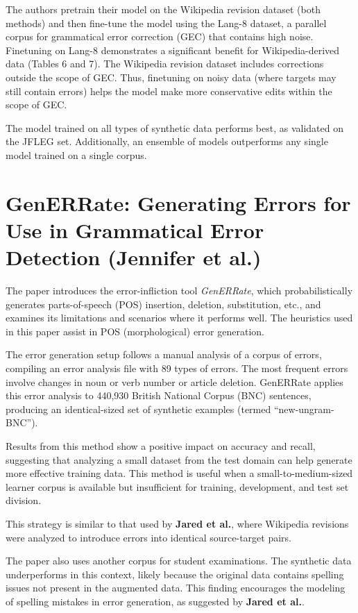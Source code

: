 \documentclass{article}
\begin{document}
The authors pretrain their model on the Wikipedia revision dataset (both methods) and then fine-tune the model using the Lang-8 dataset, a parallel corpus for grammatical error correction (GEC) that contains high noise. Finetuning on Lang-8 demonstrates a significant benefit for Wikipedia-derived data (Tables 6 and 7). The Wikipedia revision dataset includes corrections outside the scope of GEC. Thus, finetuning on noisy data (where targets may still contain errors) helps the model make more conservative edits within the scope of GEC.

The model trained on all types of synthetic data performs best, as validated on the JFLEG set. Additionally, an ensemble of models outperforms any single model trained on a single corpus.

\section{GenERRate: Generating Errors for Use in Grammatical Error Detection (Jennifer et al.)}

The paper introduces the error-infliction tool \textit{GenERRate}, which probabilistically generates parts-of-speech (POS) insertion, deletion, substitution, etc., and examines its limitations and scenarios where it performs well. The heuristics used in this paper assist in POS (morphological) error generation.

The error generation setup follows a manual analysis of a corpus of errors, compiling an error analysis file with 89 types of errors. The most frequent errors involve changes in noun or verb number or article deletion. GenERRate applies this error analysis to 440,930 British National Corpus (BNC) sentences, producing an identical-sized set of synthetic examples (termed “new-ungram-BNC”).

Results from this method show a positive impact on accuracy and recall, suggesting that analyzing a small dataset from the test domain can help generate more effective training data. This method is useful when a small-to-medium-sized learner corpus is available but insufficient for training, development, and test set division.

This strategy is similar to that used by \textbf{Jared et al.}, where Wikipedia revisions were analyzed to introduce errors into identical source-target pairs.

The paper also uses another corpus for student examinations. The synthetic data underperforms in this context, likely because the original data contains spelling issues not present in the augmented data. This finding encourages the modeling of spelling mistakes in error generation, as suggested by \textbf{Jared et al.}.
\end{document}
